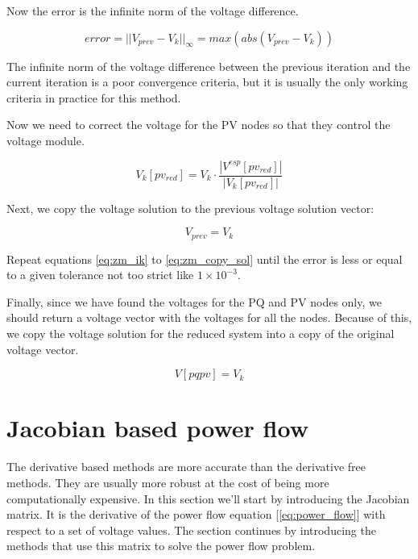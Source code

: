 \documentclass[a4paper,twoside,fleqn]{tufte-book}
\begin{document}
Now the error is the infinite norm of the voltage difference.

\begin{equation}
error = ||V_{prev} - V_k ||_{\infty} = max(abs(V_{prev} - V_k ))
\end{equation}

The infinite norm of the voltage difference between the previous iteration and the current iteration is a poor convergence criteria, but it is usually the only working criteria in practice for this method.

Now we need to correct the voltage for the PV nodes so that they control the voltage module.

\begin{equation}
V_{k}[pv_{red}] = V_k \cdot \frac{|V^{esp}[pv_{red}]|}{|V_{k}[pv_{red}]|}
\label{eq:zm_pv_correction}
\end{equation}


Next, we copy the voltage solution to the previous voltage solution vector:

\begin{equation}
V_{prev} = V_k
\label{eq:zm_copy_sol}
\end{equation}

Repeat equations \ref{eq:zm_ik} to \ref{eq:zm_copy_sol} until the error is less or equal to a given tolerance not too strict like $1\times10^{-3}$.

Finally, since we have found the voltages for the PQ and PV nodes only, we should return a voltage vector with the voltages for all the nodes. Because of this, we copy the voltage solution for the reduced system into a copy of the original voltage vector.

\begin{equation}
V[pqpv] = V_k
\end{equation}


\section{Jacobian based power flow}

The derivative based methods are more accurate than the derivative free methods. They are usually more robust at the cost of being more computationally expensive. In this section we'll start by introducing the Jacobian matrix. It is the derivative of the power flow equation  [\ref{eq:power_flow}] with respect to a set of voltage values. The section continues by introducing the methods that use this matrix to solve the power flow problem.
\end{document}
